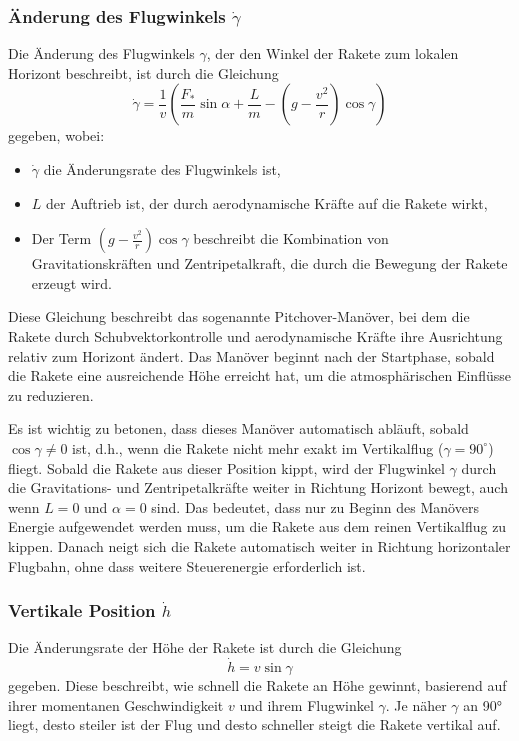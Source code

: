 \subsubsection{Änderung des Flugwinkels \(\dot{\gamma}\)}
Die Änderung des Flugwinkels \(\gamma\), der den Winkel der Rakete zum lokalen Horizont beschreibt, ist durch die Gleichung
\[
\dot{\gamma} = \frac{1}{v}\left( \frac{F_*}{m} \sin \alpha + \frac{L}{m} - \left(g - \frac{v^2}{r}\right) \cos \gamma \right)
\]
gegeben, wobei:
\begin{itemize}
	\item \(\dot{\gamma}\) die Änderungsrate des Flugwinkels ist,
	\item \(L\) der Auftrieb ist, der durch aerodynamische Kräfte auf die Rakete wirkt,
	\item Der Term \(\left(g - \frac{v^2}{r}\right) \cos \gamma\) beschreibt die Kombination von Gravitationskräften und Zentripetalkraft, die durch die Bewegung der Rakete erzeugt wird.
\end{itemize}

Diese Gleichung beschreibt das sogenannte Pitchover-Manöver, bei dem die Rakete durch Schubvektorkontrolle und aerodynamische Kräfte ihre Ausrichtung relativ zum Horizont ändert. 
Das Manöver beginnt nach der Startphase, sobald die Rakete eine ausreichende Höhe erreicht hat, um die atmosphärischen Einflüsse zu reduzieren.

Es ist wichtig zu betonen, dass dieses Manöver automatisch abläuft, sobald \(\cos \gamma \neq 0\) ist, d.h., wenn die Rakete nicht mehr exakt im Vertikalflug (\(\gamma = 90^\circ\)) fliegt. 
Sobald die Rakete aus dieser Position kippt, wird der Flugwinkel \(\gamma\) durch die Gravitations- und Zentripetalkräfte weiter in Richtung Horizont bewegt, auch wenn \(L = 0\) und \( \alpha = 0\) sind. 
Das bedeutet, dass nur zu Beginn des Manövers Energie aufgewendet werden muss, um die Rakete aus dem reinen Vertikalflug zu kippen. 
Danach neigt sich die Rakete automatisch weiter in Richtung horizontaler Flugbahn, ohne dass weitere Steuerenergie erforderlich ist.


\subsubsection{Vertikale Position \(\dot{h}\)}
Die Änderungsrate der Höhe der Rakete ist durch die Gleichung
\[
\dot{h} = v \sin \gamma
\]
gegeben. 
Diese beschreibt, wie schnell die Rakete an Höhe gewinnt, basierend auf ihrer momentanen Geschwindigkeit \(v\) und ihrem Flugwinkel \(\gamma\). 
Je näher \(\gamma\) an 90° liegt, desto steiler ist der Flug und desto schneller steigt die Rakete vertikal auf.

